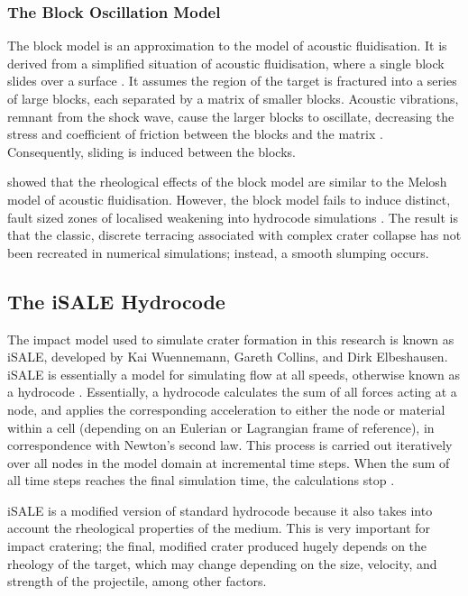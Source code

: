 \subsubsection{The Block Oscillation Model}

The block model is an approximation to the \citet{melosh1979acoustic} model of acoustic fluidisation. It is derived from a simplified situation of acoustic fluidisation, where a single block slides over a surface \citep{ivanov1997block}. It assumes the region of the target is fractured into a series of large blocks, each separated by a matrix of smaller blocks. Acoustic vibrations, remnant from the shock wave, cause the larger blocks to oscillate, decreasing the stress and coefficient of friction between the blocks and the matrix \citep{collins2002numerical,ivanov1997block}. Consequently, sliding is induced between the blocks.\bigskip

\citet{melosh1999impact} showed that the rheological effects of the block model are similar to the Melosh model of acoustic fluidisation. However, the block model fails to induce distinct, fault sized zones of localised weakening into hydrocode simulations \citep{osinski2012impact}. The result is that the classic, discrete terracing associated with complex crater collapse has not been recreated in numerical simulations; instead, a smooth slumping occurs.

\subsection{The iSALE Hydrocode}

The impact model used to simulate crater formation in this research is known as iSALE, developed by Kai Wuennemann, Gareth Collins, and Dirk Elbeshausen. iSALE is essentially a model for simulating flow at all speeds, otherwise known as a hydrocode \citep{collins2002numerical}. Essentially, a hydrocode calculates the sum of all forces acting at a node, and applies the corresponding acceleration to either the node or material within a cell (depending on an Eulerian or Lagrangian frame of reference), in correspondence with Newton's second law. This process is carried out iteratively over all nodes in the model domain at incremental time steps. When the sum of all time steps reaches the final simulation time, the calculations stop \citep{collins2002numerical}.\bigskip

iSALE is a modified version of standard hydrocode because it also takes into account the rheological properties of the medium. This is very important for impact cratering; the final, modified crater produced hugely depends on the rheology of the target, which may change depending on the size, velocity, and strength of the projectile, among other factors.